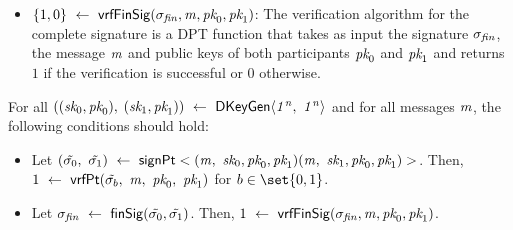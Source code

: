 \begin{definition}
\begin{itemize}
        \item $\{1,0\} ~\leftarrow~ \mathsf{vrfFinSig}(\sigma_{\mathit{fin}}, \mathit{m}, \textit{pk}_0, \textit{pk}_1) $: The verification algorithm for the complete signature is a DPT function that takes as input the signature $\sigma_{\mathit{fin}}$, the message $\mathit{m}$ and public keys of both participants $\textit{pk}_0$ and $\textit{pk}_1$ and returns $1$ if the verification is successful or $0$ otherwise.  
    \end{itemize}
\end{definition}


\begin{definition}
	For all $((\textit{sk}_0, \textit{pk}_0),$ $(\textit{sk}_1, \textit{pk}_1)) ~\leftarrow~ \mathsf{DKeyGen}\langle \mathit{1^n} ,~ \mathit{1^n} \rangle$ and for all messages $\mathit{m}$, the following conditions should hold:
	\begin{itemize}
		\item Let $(\tilde{\sigma_0} ,~ \tilde{\sigma_1}) ~\leftarrow~ \mathsf{signPt}<(\mathit{m} ,~ \textit{sk}_0, \textit{pk}_0, \textit{pk}_1)(\mathit{m} ,~ \textit{sk}_1, \textit{pk}_0, \textit{pk}_1)>$. Then, $1 ~\leftarrow~ \mathsf{vrfPt}(\tilde{\sigma_b} ,~ \mathit{m} ,~ \textit{pk}_0 ,~ \textit{pk}_1)$ for $b \in \set{0,1}$. 
		\item  Let $\sigma_{\mathit{fin}} ~\leftarrow~ \mathsf{finSig}(\tilde{\sigma_0},\tilde{\sigma_1})$. Then, $1 ~\leftarrow~ \mathsf{vrfFinSig}(\sigma_{\mathit{fin}}, \mathit{m}, \textit{pk}_0, \textit{pk}_1)$. 
	\end{itemize}
\end{definition}


